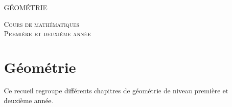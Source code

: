 
\pagestyle{empty}\thispagestyle{empty}
\vspace*{\fill}
\begin{center}
\fontsize{52}{52}\selectfont
\textsc{GÉOMÉTRIE}
\end{center}
\vfill
\begin{center}
\huge
\textsc{Cours de mathématiques}\\ 
\textsc{Première et deuxième année}
\end{center}

\begin{center}
\end{center}
\clearemptydoublepage
\thispagestyle{empty}

\vspace*{\fill}
\section*{Géométrie}


Ce recueil regroupe différents chapitres de géométrie de niveau première et deuxième année.


\vspace*{\fill}

\newpage
{}
\tableofcontents

